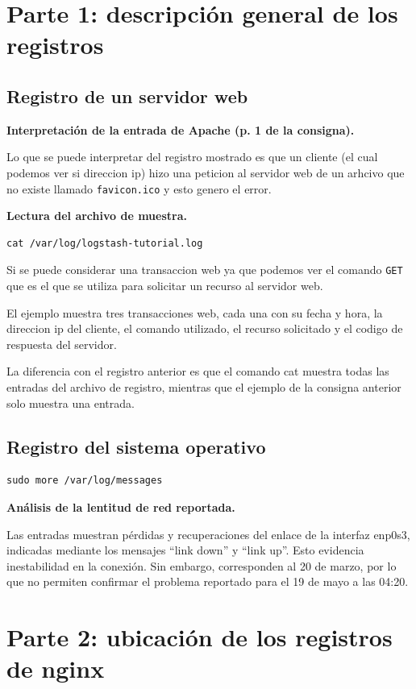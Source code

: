 \documentclass[12pt,a4paper]{article}
\begin{document}
\section{Parte 1: descripción general de los registros}
\subsection{Registro de un servidor web}
\textbf{Interpretación de la entrada de Apache (p. 1 de la consigna).}

Lo que se puede interpretar del registro mostrado es que un cliente (el cual podemos ver si direccion ip)
hizo una peticion al servidor web de un arhcivo que no existe llamado \texttt{favicon.ico} y esto genero el error.

\textbf{Lectura del archivo de muestra.}
\begin{verbatim}
cat /var/log/logstash-tutorial.log
\end{verbatim}

Si se puede considerar una transaccion web ya que podemos ver el comando \texttt{GET} que es el que se utiliza para solicitar un recurso al servidor web.

El ejemplo muestra tres transacciones web, cada una con su fecha y hora, la direccion ip del cliente, el comando utilizado, el recurso solicitado y el codigo de respuesta del servidor.

La diferencia con el registro anterior es que el comando cat muestra todas las entradas del archivo de registro, mientras que el ejemplo de la consigna anterior solo muestra una entrada.
\subsection{Registro del sistema operativo}
\begin{verbatim}
sudo more /var/log/messages
\end{verbatim}

\textbf{Análisis de la lentitud de red reportada.}

Las entradas muestran pérdidas y recuperaciones del enlace de la interfaz enp0s3, indicadas mediante los mensajes “link down” y “link up”. Esto evidencia inestabilidad en la conexión. Sin embargo, corresponden al 20 de marzo, por lo que no permiten confirmar el problema reportado para el 19 de mayo a las 04:20.
\newpage
\section{Parte 2: ubicación de los registros de nginx}
\end{document}
